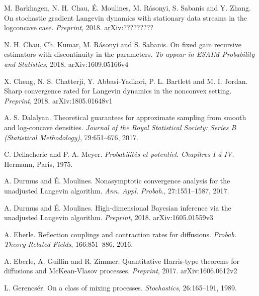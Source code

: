 \documentclass[a4paper,draft]{article}
\begin{document}
\begin{thebibliography}{00}


 M. Barkhagen, N. H. Chau, \'E. Moulines, M. R\'asonyi,
S. Sabanis and Y. Zhang.
\newblock On stochastic gradient Langevin dynamics with stationary data
streams in the logconcave case.
\newblock \emph{Preprint}, 2018. arXiv:?????????

 N. H. Chau, Ch. Kumar, M. R\'asonyi and S. Sabanis.
\newblock On fixed gain recursive estimators with discontinuity in the parameters.
\newblock \emph{To appear in ESAIM Probability and Statistics}, 2018. arXiv:1609.05166v4

 X. Cheng, N. S. Chatterji, Y. Abbasi-Yadkori,
P. L. Bartlett and M. I. Jordan.
\newblock Sharp convergence rated for Langevin dynamics in the
nonconvex setting.
\newblock \emph{Preprint}, 2018. arXiv:1805.01648v1

 A. S. Dalalyan.
\newblock Theoretical guarantees for approximate sampling from
smooth and log-concave densities.
\newblock \emph{Journal of the Royal Statistical Society:
Series B (Statistical Methodology)}, 79:651--676, 2017.

 C. Dellacherie and P.-A. Meyer.
\newblock \emph{Probabilit\'es et potentiel. Chapitres I \'a IV.}
\newblock Hermann, Paris, 1975.

 A. Durmus and \'E. Moulines.
\newblock Nonasymptotic convergence analysis for the unadjusted Langevin algorithm.
\newblock \emph{Ann. Appl. Probab.}, 27:1551--1587, 2017.

 A. Durmus and \'E. Moulines.
\newblock High-dimensional Bayesian inference via the unadjusted Langevin algorithm.
\newblock \emph{Preprint}, 2018. arXiv:1605.01559v3

A. Eberle.
\newblock Reflection couplings and contraction rates for diffusions. 
\newblock \emph{Probab. Theory Related Fields}, 166:851--886, 2016.

 A. Eberle, A. Guillin and R. Zimmer.
\newblock Quantitative Harris-type theorems for diffusions and
McKean-Vlasov processes. \newblock\emph{Preprint}, 2017.
\newblock arXiv:1606.0612v2

 L. Gerencs\'er.
\newblock On a class of mixing processes.
\newblock \emph{Stochastics},  26:165--191, 1989.


\end{thebibliography}
\end{document}

